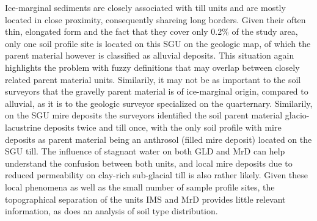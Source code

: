 \documentclass[preprint,12pt,authoryear]{elsarticle}
\begin{document}
Ice-marginal sediments are closely associated with till units and are mostly located in close proximity, consequently shareing  long borders. Given their often thin, elongated form and the fact that they cover only 0.2\% of the study area, only one soil profile site is located on this SGU on the geologic map, of which the parent material however is classified as alluvial deposits. This situation again highlights the problem with fuzzy definitions that may overlap between closely related parent material units. Similarily, it may not be as important to the soil surveyors that the gravelly parent material is of ice-marginal origin, compared to alluvial, as it is to the geologic surveyor specialized on the quarternary. 
Similarily, on the SGU mire deposits the surveyors identified the soil parent material glacio-lacustrine deposits twice and till once, with the only soil profile with mire deposits as parent material being an anthrosol (filled mire deposit) located on the SGU till. The influence of stagnant water on both GLD and MrD can help understand the confusion between both units, and local mire deposits due to reduced permeability on clay-rich sub-glacial till is also rather likely. Given these local phenomena as well as the small number of sample profile sites, the topographical separation of the units IMS and MrD provides little relevant information, as does an analysis of soil type distribution.
 
\end{document}
